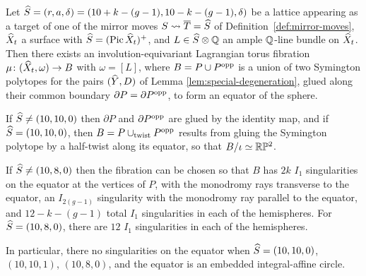 \documentclass{amsart}
\begin{document}
\begin{theorem}\label{thm:special-fibration}
  Let ${\widehat S}=(r,a,\delta)=(10+k-(g-1),10-k-(g-1),\delta)$ be a lattice appearing
  as a target of one of the mirror moves $S\leadsto{\overline T}={\widehat S}$ of
  Definition~\ref{def:mirror-moves}, ${\widehat X}_t$ a surface with
  ${\widehat S} = (\operatorname{Pic} {\widehat X}_t)^+$, and $L\in{\widehat S}\otimes{\mathbb Q}$ an ample ${\mathbb Q}$-line
  bundle on ${\widehat X}_t$. Then there exists an involution-equivariant
  Lagrangian torus fibration $\mu\colon ({\widehat X}_t,\omega)\to B$ with
  $\omega=[L]$, where $B=P\cup P^{\rm opp}$ is a
  union of two Symington polytopes for the pairs $({\widehat Y},D)$ of Lemma 
  \ref{lem:special-degeneration}, glued along their common
  boundary $\partial P = \partial P^{\rm opp}$, to form an equator
  of the sphere.

  If ${\widehat S}\ne (10,10,0)$ then $\partial P$ and $\partial P^{\rm opp}$ are glued by the identity map,
  and if ${\widehat S}= (10,10,0)$, then $B=P\cup_{\rm twist} P^{\rm opp}$ results from gluing
  the Symington polytope by a half-twist along its equator, so that $B/\iota\simeq {\mathbb R}{\mathbb P}^2$.

  If ${\widehat S}\ne (10,8,0)$ then the fibration can be chosen so that $B$ has
  $2k$ $I_1$ singularities on the equator at the vertices of $P$, with
  the monodromy rays transverse to the equator, an
  $I_{2(g-1)}$ singularity with the monodromy ray parallel to the equator,
  and $12-k-(g-1)$ total
  $I_1$ singularities in each of the hemispheres.
  For ${\widehat S}=(10,8,0)$, there are $12$ $I_1$ singularities in each of the
  hemispheres.
  
  In particular, there no singularities on the equator when ${\widehat S} = (10,10,0)$, $(10,10,1)$, 
  $(10,8,0)$, and the equator is an embedded integral-affine circle.
\end{theorem}
\end{document}
